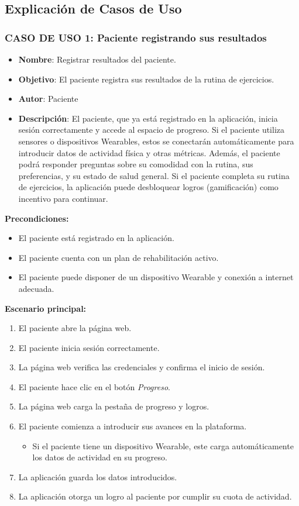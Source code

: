 \documentclass{article}
\begin{document}
\subsection{Explicación de Casos de Uso}

\subsubsection*{CASO DE USO 1: Paciente registrando sus resultados}

\begin{itemize}
	\item \textbf{Nombre}: Registrar resultados del paciente.
	\item \textbf{Objetivo}: El paciente registra sus resultados de la rutina de ejercicios.
	\item \textbf{Autor}: Paciente
	\item \textbf{Descripción}: 
	El paciente, que ya está registrado en la aplicación, inicia sesión correctamente y accede al espacio de progreso. Si el paciente utiliza sensores o dispositivos Wearables, estos se conectarán automáticamente para introducir datos de actividad física y otras métricas. Además, el paciente podrá responder preguntas sobre su comodidad con la rutina, sus preferencias, y su estado de salud general. Si el paciente completa su rutina de ejercicios, la aplicación puede desbloquear logros (gamificación) como incentivo para continuar.
\end{itemize}

\textbf{Precondiciones:}
\begin{itemize}
	\item El paciente está registrado en la aplicación.
	\item El paciente cuenta con un plan de rehabilitación activo.
	\item El paciente puede disponer de un dispositivo Wearable y conexión a internet adecuada.
\end{itemize}

\textbf{Escenario principal:}
\begin{enumerate}
	\item El paciente abre la página web.
	\item El paciente inicia sesión correctamente.
	\item La página web verifica las credenciales y confirma el inicio de sesión.
	\item El paciente hace clic en el botón \textit{Progreso}.
	\item La página web carga la pestaña de progreso y logros.
	\item El paciente comienza a introducir sus avances en la plataforma.
	\begin{itemize}
		\item Si el paciente tiene un dispositivo Wearable, este carga automáticamente los datos de actividad en su progreso.
	\end{itemize}
	\item La aplicación guarda los datos introducidos.
	\item La aplicación otorga un logro al paciente por cumplir su cuota de actividad.
\end{enumerate}
\end{document}
